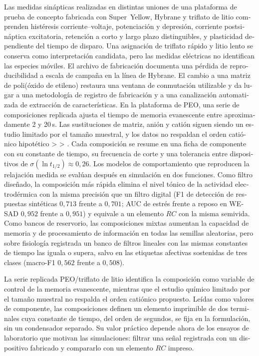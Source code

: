 \documentclass[12pt, twoside]{report}
\begin{document}
\begin{otherlanguage}{spanish}
Las medidas sinápticas realizadas en distintas uniones de una plataforma de prueba de concepto
fabricada con Super~Yellow, Hybrane y triflato de litio comprenden histéresis
corriente--voltaje, potenciación y depresión, corriente postsináptica
excitatoria, retención a corto y largo plazo distinguibles, y plasticidad
dependiente del tiempo de disparo. Una asignación de triflato rápido y litio
lento se conserva como interpretación candidata, pero las medidas eléctricas
no identifican las especies móviles. El archivo de
fabricación documenta una pérdida de reproducibilidad a escala de
campaña en la línea de Hybrane. El cambio a una matriz de poli(óxido de etileno)
restaura una ventana de conmutación utilizable y da lugar a una metodología de
registro de fabricación y a una canalización automatizada de extracción de
características. En la plataforma
de PEO, una serie de composiciones replicada ajusta el tiempo de memoria
evanescente entre aproximadamente 2 y 20\,s. Las sustituciones de matriz, anión y
catión siguen siendo un estudio limitado por el tamaño muestral, y los datos no
respaldan el orden catiónico hipotético  >  > . Cada
composición se resume en una ficha de componente con su constante de tiempo, su
frecuencia de corte y una tolerancia entre dispositivos de
$\sigma(\ln t_{1/2})\approx0{,}26$. Los modelos de comportamiento que reproducen
la relajación medida se evalúan después en simulación en dos funciones. Como
filtro diseñado, la composición más rápida elimina el nivel tónico de la
actividad electrodérmica con la misma precisión que un filtro digital (F1 de
detección de respuestas sintéticas $0{,}713$ frente a $0{,}701$; AUC de estrés
frente a reposo en WESAD $0{,}952$ frente a $0{,}951$) y equivale a un elemento
$RC$ con la misma semivida. Como bancos de reservorio, las composiciones mixtas
aumentan la capacidad de memoria y de procesamiento de información en todas las
semillas aleatorias, pero sobre fisiología registrada un banco de filtros
lineales con las mismas constantes de tiempo las iguala o supera, salvo en las
etiquetas afectivas sostenidas de tres clases (macro-F1 $0{,}562$ frente a
$0{,}508$).

La serie replicada PEO/triflato de litio identifica la composición como variable
de control de la memoria evanescente, mientras que el estudio químico limitado
por el tamaño muestral no respalda el orden catiónico propuesto. Leídas como
valores de componente, las composiciones definen un elemento imprimible de dos
terminales cuya constante de tiempo, del orden de segundos, se fija en la
formulación, sin un condensador separado. Su valor práctico depende ahora de los
ensayos de laboratorio que motivan las simulaciones: filtrar una señal registrada
con un dispositivo fabricado y compararlo con un elemento $RC$ impreso.

\end{otherlanguage}
\end{document}

